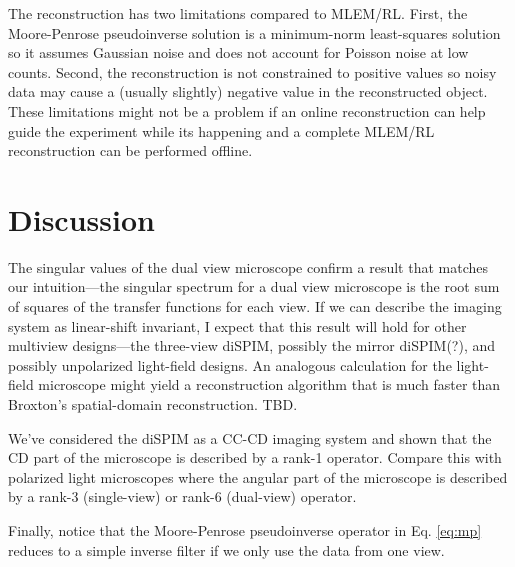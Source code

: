 \documentclass[11pt]{article}
\begin{document}
The reconstruction has two limitations compared to MLEM/RL. First, the
Moore-Penrose pseudoinverse solution is a minimum-norm least-squares solution so
it assumes Gaussian noise and does not account for Poisson noise at low counts.
Second, the reconstruction is not constrained to positive values so noisy data
may cause a (usually slightly) negative value in the reconstructed object. These
limitations might not be a problem if an online reconstruction can help guide
the experiment while its happening and a complete MLEM/RL reconstruction can be
performed offline.

\section{Discussion}
The singular values of the dual view microscope confirm a result that matches
our intuition---the singular spectrum for a dual view microscope is the root sum
of squares of the transfer functions for each view. If we can describe the
imaging system as linear-shift invariant, I expect that this result will hold
for other multiview designs---the three-view diSPIM, possibly the mirror
diSPIM(?), and possibly unpolarized light-field designs. An analogous
calculation for the light-field microscope might yield a reconstruction
algorithm that is much faster than Broxton's spatial-domain reconstruction. TBD.
 
We've considered the diSPIM as a CC-CD imaging system and shown that the CD part
of the microscope is described by a rank-1 operator. Compare this with polarized
light microscopes where the angular part of the microscope is described by a
rank-3 (single-view) or rank-6 (dual-view) operator.

Finally, notice that the Moore-Penrose pseudoinverse operator in Eq.
\ref{eq:mp} reduces to a simple inverse filter if we only use the data from one
view.
\end{document}
